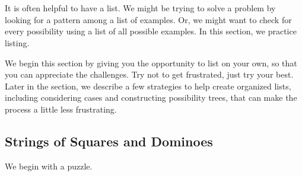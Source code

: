 \section{\seclisting}
\label{sec_listing}

It is often helpful to have a list.  We might be trying to solve a problem by looking for a pattern among a list of examples.  Or, we might want to check for every possibility using a list of all possible examples.  In this section, we practice listing. 

We begin this section by giving you the opportunity to list on your own, so that you can appreciate the challenges. Try not to get frustrated, just try your best. Later in the section, we describe a few strategies to help create organized lists, including considering cases and constructing possibility trees, that can make the process a little less frustrating. 


\newcommand{\subsqdom}{Strings of Squares and Dominoes}
\subsection{\subsqdom}
\label{sub_squares_dominoes}

We begin with a puzzle.  

